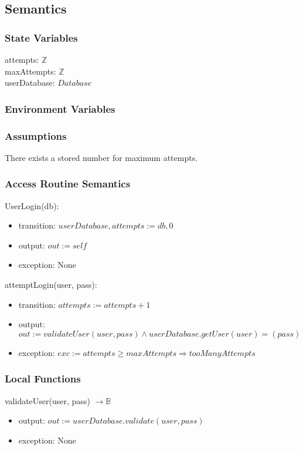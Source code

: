 \documentclass[12pt, titlepage]{article}
\begin{document}
\subsection{Semantics}

\subsubsection{State Variables}
attempts: $\mathbb{Z}$\\
maxAttempts: $\mathbb{Z}$\\
userDatabase: $Database$ \\
\subsubsection{Environment Variables}

\subsubsection{Assumptions}
There exists a stored number for maximum attempts.
\subsubsection{Access Routine Semantics}

\noindent UserLogin(db):
\begin{itemize}
	\item transition: $userDatabase, attempts := db, 0$
	\item output: $out := self$
	\item exception: None
\end{itemize}

\noindent attemptLogin(user, pass):
\begin{itemize}
	\item transition: $attempts := attempts + 1$
	\item output: $out := validateUser(user, pass) \land userDatabase.getUser(user) = (pass)$
	\item exception: $exc := attempts \ge maxAttempts \Rightarrow tooManyAttempts$
\end{itemize}

\subsubsection{Local Functions}

\noindent validateUser(user, pass) $\rightarrow \mathbb{B}$
\begin{itemize}
	\item output: $out := userDatabase.validate(user, pass)$
	\item exception: None
\end{itemize}
\newpage
\end{document}
